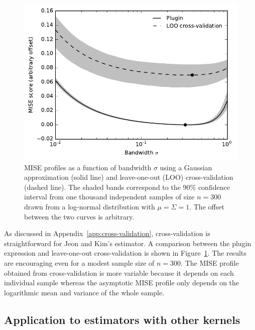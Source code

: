 \begin{figure}
\begin{centering}
\includegraphics{bandwidth-comparison}
\par\end{centering}

\caption{\label{fig:bandwidth-comparison}MISE profiles as a function of bandwidth $\sigma$ using a Gaussian approximation (solid line) and leave-one-out (LOO) cross-validation (dashed line). The shaded bands correspond to the 90\% confidence interval from one thousand independent samples of size $n=300$ drawn from a log-normal distribution with $\mu=\Sigma=1$. The offset between the two curves is arbitrary.}
\end{figure}
As discussed in Appendix~\ref{app:cross-validation}, cross-validation is straightforward for Jeon and Kim's estimator. A comparison between the plugin expression and leave-one-out cross-validation is shown in Figure~\ref{fig:bandwidth-comparison}. The results are encouraging even for a modest sample size of $n=300$. The MISE profile obtained from cross-validation is more variable because it depends on each individual sample whereas the asymptotic MISE profile only depends on the logarithmic mean and variance of the whole sample.


\subsection{Application to estimators with other kernels\label{subsec:other-kernels}}

